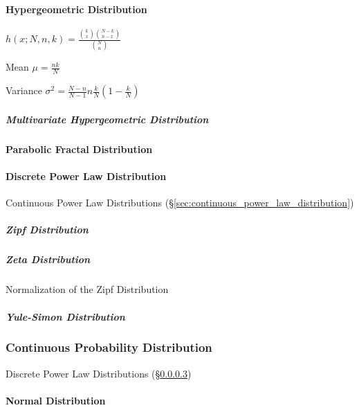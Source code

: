 \paragraph{Hypergeometric Distribution}\hfill
\label{sec:hypergeometric_distribution}

$h(x; N, n, k) = \frac{\binom{k}{x} \binom{N-k}{n-x}}{\binom{N}{n}}$

Mean $\mu = \frac{nk}{N}$

Variance $\sigma^2 = \frac{N-n}{N-1} n \frac{k}{N}(1 - \frac{k}{N})$



\subparagraph{Multivariate Hypergeometric Distribution}\hfill
\label{sec:multivariate_hypergeometric}



\paragraph{Parabolic Fractal Distribution}
\label{sec:parabolic_fractal_distribution}\hfill

\paragraph{Discrete Power Law Distribution}
\label{sec:discrete_power_law_distribution}\hfill

\fist Continuous Power Law Distributions
(\S\ref{sec:continuous_power_law_distribution})



\subparagraph{Zipf Distribution}\label{sec:zipf_distribution}\hfill

\subparagraph{Zeta Distribution}\label{sec:zeta_distribution}\hfill

Normalization of the Zipf Distribution

\subparagraph{Yule-Simon Distribution}
\label{sec:yule_simon_distribution}\hfill



\subsubsection{Continuous Probability Distribution}
\label{sec:continuous_probability}

\fist Discrete Power Law Distributions
(\S\ref{sec:discrete_power_law_distribution})



\paragraph{Normal Distribution}\label{sec:normal_distribution}\hfill

